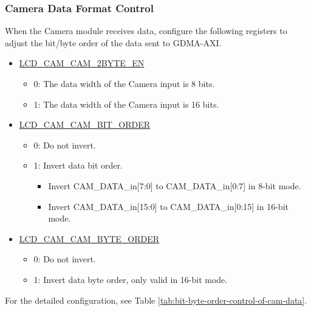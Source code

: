 \documentclass[main\_\_EN.tex]{subfiles}
\begin{document}
\subsubsection{Camera Data Format Control} \label{sec:cam_data_control}
When the Camera module receives data, configure the following registers to adjust the bit/byte order of the data sent to GDMA-AXI.
\begin{itemize}
    \item \hyperref[fielddesc:LCDCAMCAM2BYTEEN]{LCD\_CAM\_CAM\_2BYTE\_EN}
    \begin{itemize}
        \item 0: The data width of the Camera input is 8 bits.
        \item 1: The data width of the Camera input is 16 bits.
    \end{itemize}
    \item \hyperref[fielddesc:LCDCAMCAMBITORDER]{LCD\_CAM\_CAM\_BIT\_ORDER}
        \begin{itemize}
        \item 0: Do not invert.
        \item 1: Invert data bit order.
        \begin{itemize}
            \item Invert CAM\_DATA\_in[7:0] to CAM\_DATA\_in[0:7] in 8-bit mode.
            \item Invert CAM\_DATA\_in[15:0] to CAM\_DATA\_in[0:15] in 16-bit mode.
        \end{itemize}
    \end{itemize}
    \item \hyperref[fielddesc:LCDCAMCAMBYTEORDER]{LCD\_CAM\_CAM\_BYTE\_ORDER}
    \begin{itemize}
        \item 0: Do not invert.
        \item 1: Invert data byte order, only valid in 16-bit mode.
    \end{itemize}
\end{itemize}

For the detailed configuration, see Table \ref{tab:bit-byte-order-control-of-cam-data}.
\end{document}
